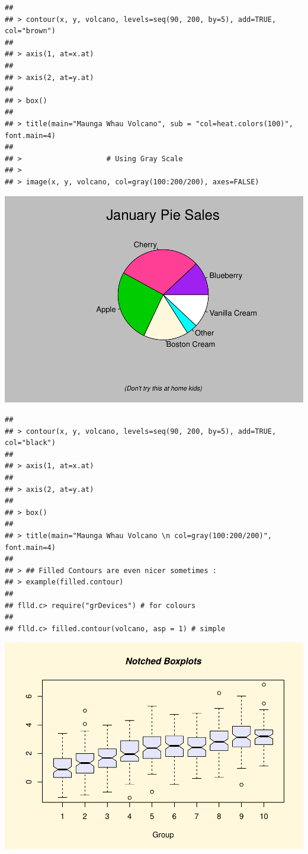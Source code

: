 \documentclass[
]{book}
\begin{document}
\begin{verbatim}
## 
## > contour(x, y, volcano, levels=seq(90, 200, by=5), add=TRUE, col="brown")
## 
## > axis(1, at=x.at)
## 
## > axis(2, at=y.at)
## 
## > box()
## 
## > title(main="Maunga Whau Volcano", sub = "col=heat.colors(100)", font.main=4)
## 
## >                    # Using Gray Scale
## > 
## > image(x, y, volcano, col=gray(100:200/200), axes=FALSE)
\end{verbatim}

\includegraphics{TudodoR_files/figure-latex/unnamed-chunk-147-3.pdf}

\begin{verbatim}
## 
## > contour(x, y, volcano, levels=seq(90, 200, by=5), add=TRUE, col="black")
## 
## > axis(1, at=x.at)
## 
## > axis(2, at=y.at)
## 
## > box()
## 
## > title(main="Maunga Whau Volcano \n col=gray(100:200/200)", font.main=4)
## 
## > ## Filled Contours are even nicer sometimes :
## > example(filled.contour)
## 
## flld.c> require("grDevices") # for colours
## 
## flld.c> filled.contour(volcano, asp = 1) # simple
\end{verbatim}

\includegraphics{TudodoR_files/figure-latex/unnamed-chunk-147-4.pdf}
\end{document}
